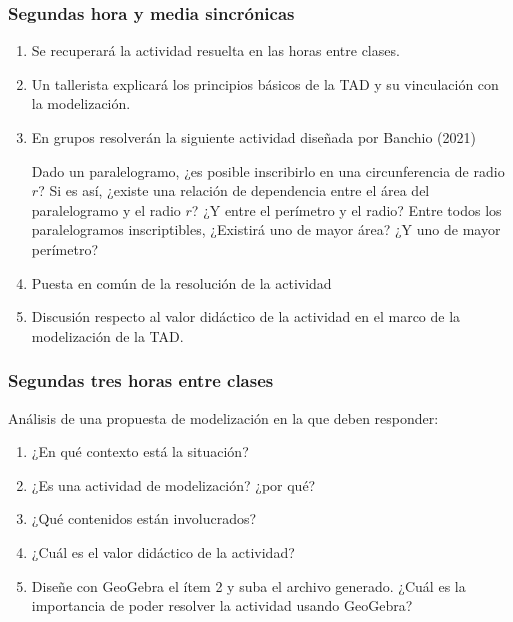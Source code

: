 \subsubsection{Segundas hora y media sincrónicas}

\begin{enumerate}
	\item Se recuperará la actividad resuelta en las horas entre clases.
	\item Un tallerista explicará los principios básicos de la TAD y su vinculación con la modelización.
	\item En grupos resolverán la siguiente actividad diseñada por Banchio (2021)
	
	\begin{actividad}
		Dado un paralelogramo, ¿es posible inscribirlo en una circunferencia de radio $r$? Si es así, ¿existe una relación de dependencia entre el área del paralelogramo y el radio $r$? ¿Y entre el perímetro y el radio? Entre todos los paralelogramos inscriptibles, ¿Existirá uno de mayor área? ¿Y uno de mayor perímetro?
	\end{actividad}
	
	\item Puesta en común de la resolución de la actividad
	\item Discusión respecto al valor didáctico de la actividad en el marco de la modelización de la TAD.
\end{enumerate}

\subsubsection{Segundas tres horas entre clases}

Análisis de una propuesta de modelización en la que deben responder:
\begin{enumerate}[a]
	\item ¿En qué contexto está la situación?
	\item ¿Es una actividad de modelización? ¿por qué?
	\item ¿Qué contenidos están involucrados?
	\item ¿Cuál es el valor didáctico de la actividad?
	\item Diseñe con GeoGebra el ítem 2 y suba el archivo generado. ¿Cuál es la importancia de poder resolver la actividad usando GeoGebra?
\end{enumerate}

\bigskip


